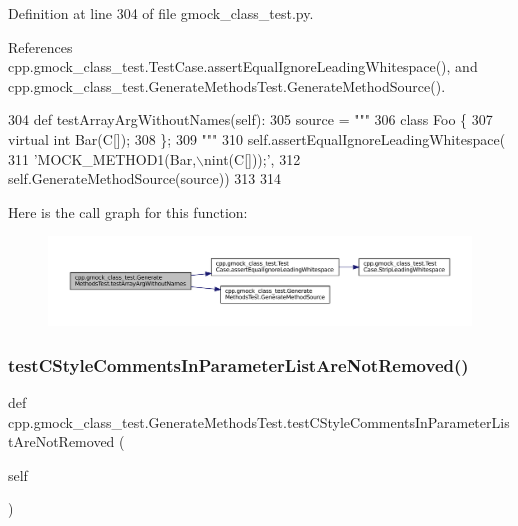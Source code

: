 Definition at line 304 of file gmock\+\_\+class\+\_\+test.\+py.



References cpp.\+gmock\+\_\+class\+\_\+test.\+Test\+Case.\+assert\+Equal\+Ignore\+Leading\+Whitespace(), and cpp.\+gmock\+\_\+class\+\_\+test.\+Generate\+Methods\+Test.\+Generate\+Method\+Source().


\begin{DoxyCode}
304   \textcolor{keyword}{def }testArrayArgWithoutNames(self):
305     source = \textcolor{stringliteral}{"""}
306 \textcolor{stringliteral}{class Foo \{}
307 \textcolor{stringliteral}{  virtual int Bar(C[]);}
308 \textcolor{stringliteral}{\};}
309 \textcolor{stringliteral}{"""}
310     self.assertEqualIgnoreLeadingWhitespace(
311         \textcolor{stringliteral}{'MOCK\_METHOD1(Bar,\(\backslash\)nint(C[]));'},
312         self.GenerateMethodSource(source))
313 
314 
\end{DoxyCode}
Here is the call graph for this function\+:
\nopagebreak
\begin{figure}[H]
\begin{center}
\leavevmode
\includegraphics[width=350pt]{classcpp_1_1gmock__class__test_1_1GenerateMethodsTest_a544cd40e30b5dc3fbcf42385f0a54ad1_cgraph}
\end{center}
\end{figure}
\mbox{\label{classcpp_1_1gmock__class__test_1_1GenerateMethodsTest_afa44c6ac675ce7454ff0f51164bde59e}} 
\subsubsection{\texorpdfstring{test\+C\+Style\+Comments\+In\+Parameter\+List\+Are\+Not\+Removed()}{testCStyleCommentsInParameterListAreNotRemoved()}}
{\footnotesize\ttfamily def cpp.\+gmock\+\_\+class\+\_\+test.\+Generate\+Methods\+Test.\+test\+C\+Style\+Comments\+In\+Parameter\+List\+Are\+Not\+Removed (\begin{DoxyParamCaption}\item[{}]{self }\end{DoxyParamCaption})}



